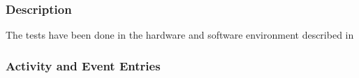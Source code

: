 






\subsubsection{Description}

The tests have been done in the hardware and software environment
described in  




\subsubsection{Activity and Event Entries}

